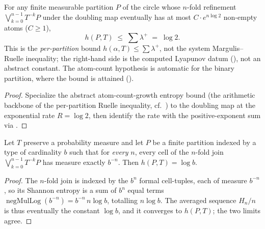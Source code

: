 \begin{theorem}\label{doublingMap_ksEntropyPartition_le_sumPosExp}
  \leanok
  For any finite measurable partition \(P\) of the circle whose \(n\)-fold refinement
  \(\bigvee_{k=0}^{n-1}T^{-k}P\) under the doubling map eventually has at most
  \(C\cdot e^{n\log 2}\) non-empty atoms (\(C\ge 1\)),
  \[
    h(P, T) \;\le\; \sum\lambda^{+} \;=\; \log 2 .
  \]
  This is the \emph{per-partition} bound \(h(\alpha,T)\le\sum\lambda^{+}\), not the system
  Margulis--Ruelle inequality; the right-hand side is the computed Lyapunov datum
  (), not an abstract constant. The atom-count hypothesis
  is automatic for the binary partition, where the bound is attained
  ().
\end{theorem}
\begin{proof}\leanok
  Specialize the abstract atom-count-growth entropy bound (the arithmetic backbone of the
  per-partition Ruelle inequality, cf.\ ) to the doubling map at the
  exponential rate \(R = \log 2\), then identify the rate with the positive-exponent sum via
  .
\end{proof}

\begin{proposition}\label{ksEntropyPartition_of_uniform}
  \leanok
  Let \(T\) preserve a probability measure and let \(P\) be a finite partition indexed by a type
  of cardinality \(b\) such that for \emph{every} \(n\), every cell of the \(n\)-fold join
  \(\bigvee_{k=0}^{n-1}T^{-k}P\) has measure exactly \(b^{-n}\). Then
  \(h(P,T) = \log b\).
\end{proposition}
\begin{proof}\leanok
  The \(n\)-fold join is indexed by the \(b^n\) formal cell-tuples, each of measure \(b^{-n}\), so
  its Shannon entropy is a sum of \(b^n\) equal terms
  \(\operatorname{negMulLog}(b^{-n}) = b^{-n}\,n\log b\), totalling \(n\log b\). The averaged
  sequence \(H_n/n\) is thus eventually the constant \(\log b\), and it converges to
  \(h(P,T)\); the two limits agree.
\end{proof}

